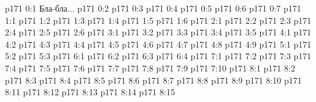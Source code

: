 \author{Промежуточные создания}
\vs p171 0:1  Бла-бла...
\vs p171 0:2 
\vs p171 0:3 
\vs p171 0:4 \pc 
\vs p171 0:5 
\vs p171 0:6 
\vs p171 0:7 
\vs p171 1:1 
\vs p171 1:2 
\vs p171 1:3 
\vs p171 1:4 
\vs p171 1:5 \pc 
\vs p171 1:6 
\vs p171 2:1 
\vs p171 2:2 \pc 
\vs p171 2:3 
\vs p171 2:4 
\vs p171 2:5 
\vs p171 2:6 \pc 
{}
\vs p171 3:1 
\vs p171 3:2 
\vs p171 3:3 
\vs p171 3:4 
\vs p171 3:5 
\vs p171 4:1 
\vs p171 4:2 
\vs p171 4:3 
\vs p171 4:4 \pc 
\vs p171 4:5 
\vs p171 4:6 
\vs p171 4:7 
\vs p171 4:8 \pc 
\vs p171 4:9 
\vs p171 5:1 
\vs p171 5:2 
\vs p171 5:3 
\vs p171 6:1 
\vs p171 6:2 
\vs p171 6:3 
\vs p171 6:4 
\vs p171 7:1 
\vs p171 7:2 
\vs p171 7:3 
\vs p171 7:4 
\vs p171 7:5 
\vs p171 7:6 
\vs p171 7:7 
\vs p171 7:8 
\vs p171 7:9 
\vs p171 7:10 
\vs p171 8:1 
\vs p171 8:2 
\vs p171 8:3 \pc 
\vs p171 8:4 
\vs p171 8:5 
\vs p171 8:6 
\vs p171 8:7 
\vs p171 8:8 \pc 
\vs p171 8:9 
\vs p171 8:10 
\vs p171 8:11 
\vs p171 8:12 
\vs p171 8:13 
\vs p171 8:14 \pc 
\vs p171 8:15 
\quizlink
